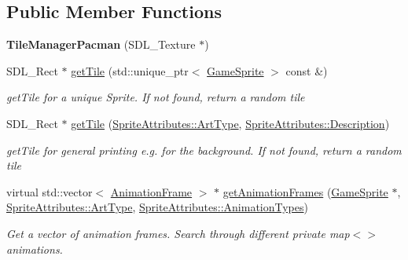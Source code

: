 \subsection*{Public Member Functions}
\begin{DoxyCompactItemize}
\item 
\mbox{\label{class_tile_manager_pacman_aefac3ed0dac94e0c902ec6bbf46c80dc}} 
{\bfseries Tile\+Manager\+Pacman} (S\+D\+L\+\_\+\+Texture $\ast$)
\item 
\mbox{\label{class_tile_manager_pacman_a894bfcc9797ba2fae23fefd5fe8bf746}} 
S\+D\+L\+\_\+\+Rect $\ast$ \mbox{\hyperlink{class_tile_manager_pacman_a894bfcc9797ba2fae23fefd5fe8bf746}{get\+Tile}} (std\+::unique\+\_\+ptr$<$ \mbox{\hyperlink{class_game_sprite}{Game\+Sprite}} $>$ const \&)
\begin{DoxyCompactList}\small\item\em get\+Tile for a unique Sprite. If not found, return a random tile \end{DoxyCompactList}\item 
\mbox{\label{class_tile_manager_pacman_a568c5ba61e31e85aef39656dc9af1596}} 
S\+D\+L\+\_\+\+Rect $\ast$ \mbox{\hyperlink{class_tile_manager_pacman_a568c5ba61e31e85aef39656dc9af1596}{get\+Tile}} (\mbox{\hyperlink{namespace_sprite_attributes_afb5447c311bc29f0ce8ddfd025c6e998}{Sprite\+Attributes\+::\+Art\+Type}}, \mbox{\hyperlink{namespace_sprite_attributes_a3ece96d6288b14d53d84e2138392395c}{Sprite\+Attributes\+::\+Description}})
\begin{DoxyCompactList}\small\item\em get\+Tile for general printing e.\+g. for the background. If not found, return a random tile \end{DoxyCompactList}\item 
\mbox{\label{class_tile_manager_pacman_a95298f9c5f6b308e6425168aa40f9569}} 
virtual std\+::vector$<$ \mbox{\hyperlink{class_animation_frame}{Animation\+Frame}} $>$ $\ast$ \mbox{\hyperlink{class_tile_manager_pacman_a95298f9c5f6b308e6425168aa40f9569}{get\+Animation\+Frames}} (\mbox{\hyperlink{class_game_sprite}{Game\+Sprite}} $\ast$, \mbox{\hyperlink{namespace_sprite_attributes_afb5447c311bc29f0ce8ddfd025c6e998}{Sprite\+Attributes\+::\+Art\+Type}}, \mbox{\hyperlink{namespace_sprite_attributes_ae1a753cb32f500b34381aac4b197b3a7}{Sprite\+Attributes\+::\+Animation\+Types}})
\begin{DoxyCompactList}\small\item\em Get a vector of animation frames. Search through different private map$<$$>$animations. \end{DoxyCompactList}\end{DoxyCompactItemize}
